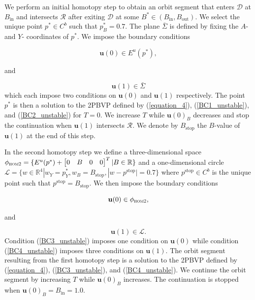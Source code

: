\documentclass{ws-ijbc}
\begin{document}
We perform an initial homotopy step to obtain an orbit segment that enters $\mathscr{D}$ at $B_{\mathrm{in}}$ and intersects $\mathscr{R}$ after exiting $\mathscr{D}$ at some $B^* \in (B_{\mathrm{in}}, B_{\mathrm{out}})$.  We select the unique point $p^* \in C^b$ such that $p^*_B=0.7$.  The plane $\bar{\Sigma}$ is defined by fixing the $A$- and $Y$- coordinates of $p^*$.  We impose the boundary conditions

\begin{equation}
\mathbf{u}(0) \in E^u(p^*),
\label{BC1_unstable}
\end{equation}

and 

\begin{equation}
\mathbf{u}(1) \in \bar{\Sigma}
\label{BC2_unstable}
\end{equation}
\noindent
which each impose two conditions on $\mathbf{u}(0)$ and $\mathbf{u}(1)$ respectively.  The point $p^*$ is then a solution to the 2PBVP defined by (\ref{equation_4}), (\ref{BC1_unstable}), and (\ref{BC2_unstable}) for $T=0$.  We increase $T$ while $\mathbf{u}(0)_B$ decreases and stop the continuation when $\mathbf{u}(1)$ intersects $\mathscr{R}$.  We denote by $B_{\mathrm{stop}}$ the $B$-value of $\mathbf{u}(1)$ at the end of this step.

In the second homotopy step we define a three-dimensional space $\phi_{\textsc{hom2}} = \{E^u(p^*) + \begin{bmatrix} 0 & B & 0 & 0 \end{bmatrix}^{T}| B \in \mathbb{R} \}$ and a one-dimensional circle $\mathscr{L} = \{ w \in \mathbb{R}^4 | w_Y=p^*_Y, w_B=B_{\mathrm{stop}}, |w-p^{\mathrm{stop}}|=0.7\}$ where $p^{\mathrm{stop}} \in C^b$ is the unique point such that $p^{\mathrm{stop}} = B_{\mathrm{stop}}$.  We then impose the boundary conditions

\begin{equation}
\mathbf{u}(0) \in \phi_{\textsc{hom2}},
\label{BC3_unstable}
\end{equation}

and 

\begin{equation}
\mathbf{u}(1) \in \mathscr{L}.
\label{BC4_unstable}
\end{equation}
\noindent
Condition (\ref{BC3_unstable}) imposes one condition on $\mathbf{u}(0)$ while condition (\ref{BC4_unstable}) imposes three conditions on $\mathbf{u}(1)$.  The orbit segment resulting from the first homotopy step is a solution to the 2PBVP defined by (\ref{equation_4}), (\ref{BC3_unstable}), and (\ref{BC4_unstable}).  We continue the orbit segment by increasing $T$ while $\mathbf{u}(0)_B$ increases.  The continuation is stopped when $\mathbf{u}(0)_B = B_{\mathrm{in}}=1.0$.
\end{document}
